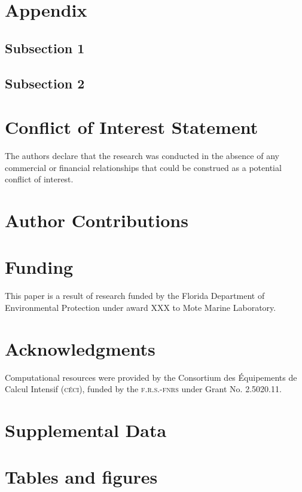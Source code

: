 \documentclass[utf8]{frontiersSCNS}
\begin{document}
\section*{Appendix}

\subsection*{Subsection 1}
\subsection*{Subsection 2}

\section*{Conflict of Interest Statement}
The authors declare that the research was conducted in the absence of any commercial or financial relationships that could be construed as a potential conflict of interest.

\section*{Author Contributions}
  
\section*{Funding}
This paper is a result of research funded by the Florida Department of Environmental Protection under award XXX to Mote Marine Laboratory. 

\section*{Acknowledgments}
Computational resources were provided by the Consortium des \'Equipements de Calcul Intensif (\textsc{c\'eci}), funded by the \textsc{f.r.s.-fnrs} under Grant No. 2.5020.11.

\section*{Supplemental Data}

 



\section*{Tables and figures}
\end{document}
